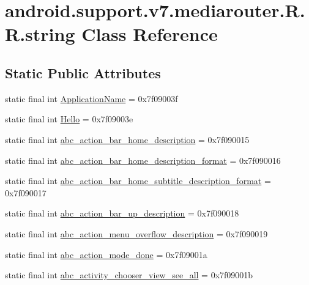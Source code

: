 \hypertarget{classandroid_1_1support_1_1v7_1_1mediarouter_1_1_r_1_1string}{
\section{android.support.v7.mediarouter.R.R.string Class Reference}
\label{classandroid_1_1support_1_1v7_1_1mediarouter_1_1_r_1_1string}
}
\subsection*{Static Public Attributes}
\begin{CompactItemize}
\item 
static final int \hyperlink{classandroid_1_1support_1_1v7_1_1mediarouter_1_1_r_1_1string_65f488f3b033ae241ec76aa387dba160}{ApplicationName} = 0x7f09003f
\item 
static final int \hyperlink{classandroid_1_1support_1_1v7_1_1mediarouter_1_1_r_1_1string_ee6398a912cd4e60d95780c240aa7730}{Hello} = 0x7f09003e
\item 
static final int \hyperlink{classandroid_1_1support_1_1v7_1_1mediarouter_1_1_r_1_1string_d3b92126d595e8c148d8d2b38dadee92}{abc\_\-action\_\-bar\_\-home\_\-description} = 0x7f090015
\item 
static final int \hyperlink{classandroid_1_1support_1_1v7_1_1mediarouter_1_1_r_1_1string_054ef0137081f1a3d9d47bad99640762}{abc\_\-action\_\-bar\_\-home\_\-description\_\-format} = 0x7f090016
\item 
static final int \hyperlink{classandroid_1_1support_1_1v7_1_1mediarouter_1_1_r_1_1string_71833983937fc07960e0a2cec87f5bc2}{abc\_\-action\_\-bar\_\-home\_\-subtitle\_\-description\_\-format} = 0x7f090017
\item 
static final int \hyperlink{classandroid_1_1support_1_1v7_1_1mediarouter_1_1_r_1_1string_4beebebda629913b53a32fed5830bb26}{abc\_\-action\_\-bar\_\-up\_\-description} = 0x7f090018
\item 
static final int \hyperlink{classandroid_1_1support_1_1v7_1_1mediarouter_1_1_r_1_1string_91820f3a6a46c8b4272bf1bc574de197}{abc\_\-action\_\-menu\_\-overflow\_\-description} = 0x7f090019
\item 
static final int \hyperlink{classandroid_1_1support_1_1v7_1_1mediarouter_1_1_r_1_1string_6a4c23d2c71d335d3c57776e373da194}{abc\_\-action\_\-mode\_\-done} = 0x7f09001a
\item 
static final int \hyperlink{classandroid_1_1support_1_1v7_1_1mediarouter_1_1_r_1_1string_18551731af09761dc48bb7a25e0611b4}{abc\_\-activity\_\-chooser\_\-view\_\-see\_\-all} = 0x7f09001b

\end{CompactItemize}
